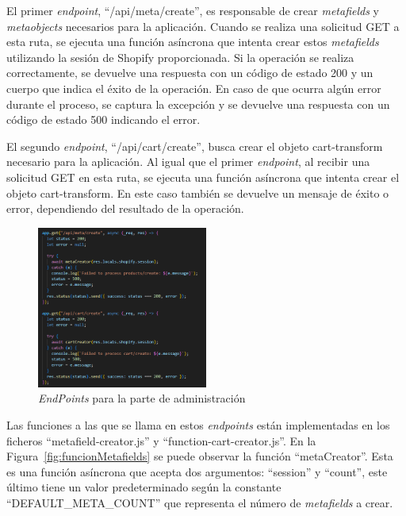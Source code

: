 \documentclass[11pt]{article}
\begin{document}
El primer \textit{endpoint}, ``/api/meta/create'', es responsable de crear \textit{metafields} y \textit{metaobjects} necesarios para la aplicación. Cuando se realiza
una solicitud GET a esta ruta, se ejecuta una función asíncrona que intenta crear estos \textit{metafields} utilizando la sesión de Shopify proporcionada.
Si la operación se realiza correctamente, se devuelve una respuesta con un código de estado 200 y un cuerpo que indica el éxito de la operación. 
En caso de que ocurra algún error durante el proceso, se captura la excepción y se devuelve una respuesta con un código 
de estado 500 indicando el error.

El segundo \textit{endpoint}, ``/api/cart/create'', busca crear el objeto cart-transform necesario para la aplicación. Al igual que el primer \textit{endpoint}, al recibir
una solicitud GET en esta ruta, se ejecuta una función asíncrona que intenta crear el objeto cart-transform. En este caso también se devuelve un 
mensaje de éxito o error, dependiendo del resultado de la operación.

\begin{figure}[H]
    \centering
    \includegraphics[width=0.5\textwidth]{imagenes-back/EndpointsAdmin.png}
    \caption{\label{fig:endpointsAdmin} \textit{EndPoints} para la parte de administración }
    \vspace{\fill}
\end{figure}

Las funciones a las que se llama en estos \textit{endpoints} están implementadas en los ficheros ``metafield-creator.js'' y ``function-cart-creator.js''.
En la Figura~\ref{fig:funcionMetafields} se puede observar la función ``metaCreator''. Esta es una función asíncrona que acepta dos argumentos:
``session'' y ``count'', este último tiene un valor predeterminado según la constante ``DEFAULT\_META\_COUNT'' que representa el número de \textit{metafields} a crear.
\end{document}
